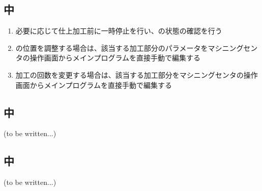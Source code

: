 \clearpage
\subsection{\EndFaceInCChamferMilling 中}
\begin{enumerate}[label=\sarrow]
\item 必要に応じて仕上加工前に一時停止を行い、\EndFaceInCChamfer の状態の確認を行う
\item \EndFaceInCChamfer の位置を調整する場合は、該当する加工部分のパラメータをマシニングセンタの操作画面からメインプログラムを直接手動で編集する
\item {}加工の回数を変更する場合は、該当する加工部分をマシニングセンタの操作画面からメインプログラムを直接手動で編集する
\end{enumerate}


\subsection{\EndFaceBoringMilling 中\TBW}
(to be written...)


\subsection{\IncutMilling 中\TBW}
(to be written...)



\clearpage


